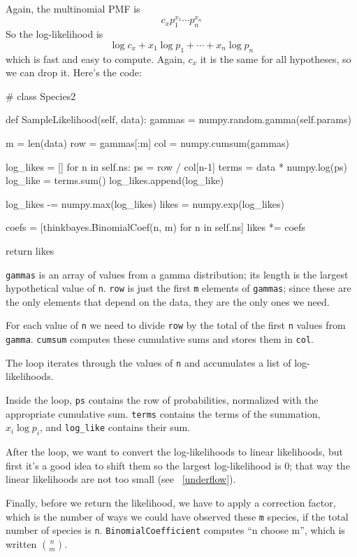 \documentclass[12pt]{book}
\theoremstyle{exercise}
\newcommand{\py}[1]{{\tt #1}}%
\begin{document}
Again, the multinomial PMF is
%
\[ c_x p_1^{x_1} \cdots p_n^{x_n} \]
%
So the log-likelihood is
%
\[ \log c_x + x_1 \log p_1 + \cdots + x_n \log p_n \]
%
which is fast and easy to compute.  Again, $c_x$
it is the same for all hypotheses, so we can drop it.
Here's the code:

\begin{code}
# class Species2

    def SampleLikelihood(self, data):
        gammas = numpy.random.gamma(self.params)

        m = len(data)
        row = gammas[:m]
        col = numpy.cumsum(gammas)

        log_likes = []
        for n in self.ns:
            ps = row / col[n-1]
            terms = data * numpy.log(ps)
            log_like = terms.sum()
            log_likes.append(log_like)

        log_likes -= numpy.max(log_likes)
        likes = numpy.exp(log_likes)

        coefs = [thinkbayes.BinomialCoef(n, m) for n in self.ns]
        likes *= coefs

        return likes
\end{code}

\py{gammas} is an array of values from a gamma distribution; its
length is the largest hypothetical value of \py{n}.  \py{row} is
just the first \py{m} elements of \py{gammas}; since these are the
only elements that depend on the data, they are the only ones we need.

For each value of \py{n} we need to divide \py{row} by the
total of the first \py{n} values from \py{gamma}.  \py{cumsum}
computes these cumulative sums and stores them in \py{col}.

The loop iterates through the values of \py{n} and accumulates
a list of log-likelihoods.

Inside the loop, \py{ps} contains the row of probabilities, normalized
with the appropriate cumulative sum.  \py{terms} contains the
terms of the summation, $x_i \log p_i$, and \verb"log_like" contains
their sum.

After the loop, we want to convert the log-likelihoods to linear
likelihoods, but first it's a good idea to shift them so the largest
log-likelihood is 0; that way the linear likelihoods are not too
small (see ~\ref{underflow}).

Finally, before we return the likelihood, we have to apply a correction
factor, which is the number of ways we could have observed these \py{m}
species, if the total number of species is \py{n}.
\py{BinomialCoefficient} computes ``n choose m'', which is written
$\binom{n}{m}$.
\end{document}

